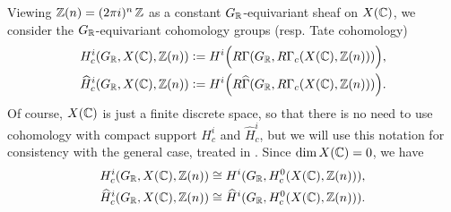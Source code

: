\documentclass[draft]{article}
\numberwithin{equation}{section}
\begin{document}
Viewing $\mathbb{Z} (n) = (2\pi i)^n\,\mathbb{Z}$ as a constant $G_{\mathbb{R}}$-equivariant sheaf on
$X(\mathbb{C})$, we consider the $G_{\mathbb{R}}$-equivariant cohomology groups (resp. Tate
cohomology)
\begin{align*}
  H^i_c (G_{\mathbb{R}}, X(\mathbb{C}), \mathbb{Z}(n)) & \mathrel{\mathop:}= H^i \Bigl(R\Gamma (G_{\mathbb{R}}, R\Gamma_c (X(\mathbb{C}), \mathbb{Z}(n)))\Bigr), \\
  \widehat{H}^i_c (G_{\mathbb{R}}, X(\mathbb{C}), \mathbb{Z}(n)) & \mathrel{\mathop:}= H^i \Bigl(R\widehat{\Gamma} (G_{\mathbb{R}}, R\Gamma_c (X(\mathbb{C}), \mathbb{Z}(n)))\Bigr).
\end{align*}
Of course, $X(\mathbb{C})$ is just a finite discrete space, so that there is no need
to use cohomology with compact support $H^i_c$ and $\widehat{H}^i_c$, but we
will use this notation for consistency with the general case, treated in
\cite{Beshenov-Weil-etale-1}. Since $\dim X(\mathbb{C}) = 0$, we have
\begin{align*}
  H^i_c (G_{\mathbb{R}}, X(\mathbb{C}), \mathbb{Z}(n)) & \cong H^i (G_{\mathbb{R}}, H^0_c (X(\mathbb{C}), \mathbb{Z}(n))), \\
  \widehat{H}^i_c (G_{\mathbb{R}}, X(\mathbb{C}), \mathbb{Z}(n)) & \cong \widehat{H}^i (G_{\mathbb{R}}, H^0_c (X(\mathbb{C}), \mathbb{Z}(n))).
\end{align*}
\end{document}
